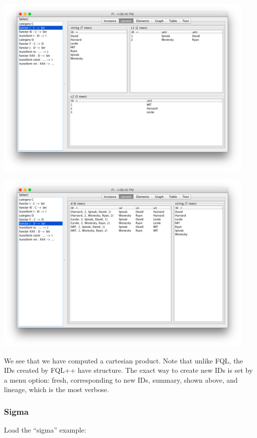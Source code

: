 \documentclass[12pt]{article}
\begin{document}
\begin{center}
\includegraphics[width=5in]{piI}

\includegraphics[width=5in]{piJ}
\end{center}

We see that we have computed a cartesian product.  Note that unlike FQL, the IDs created by FQL++ have structure.  The exact way to create new IDs is set by a menu option: fresh, corresponding to new IDs, summary, shown above, and lineage, which is the most verbose.

\subsubsection{Sigma}


Load the ``sigma'' example:
\end{document}
